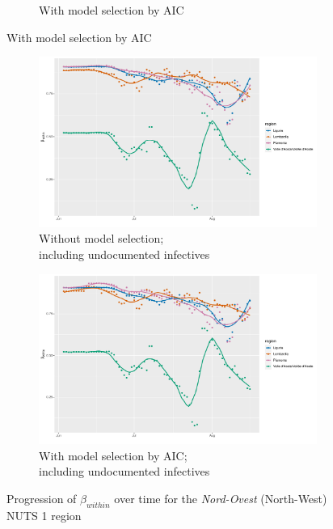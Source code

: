 \documentclass[12pt]{article}
\begin{document}
\begin{appendices}
\begin{figure}[H]
\begin{subfigure}{\textwidth}
    	      \caption{With model selection by AIC}
    	      \label{fig:beta_within_over_time_northwest_aic}
    	    \end{subfigure}
        \end{figure}
        \begin{figure}[H]\ContinuedFloat
    	    \begin{subfigure}{\textwidth}
    	      \centering
    	      \includegraphics[width=0.95\linewidth]{output/model1_lag3_betawithin_Nord-Ovest_UndocQuadratic_rolling.pdf}
    	      \caption{Without model selection; \\ including undocumented infectives}
    	      \label{fig:beta_within_over_time_northwest_regular_undoc}
    	    \end{subfigure}\newline
    	    \begin{subfigure}{\textwidth}
    	      \centering
    	      \includegraphics[width=0.95\linewidth]{output/model1_lag3_betawithin_Nord-Ovest_aic_UndocQuadratic_rolling.pdf}
    	      \caption{With model selection by AIC; \\ including undocumented infectives}
    	      \label{fig:beta_within_over_time_northwest_aic_undoc}
    	    \end{subfigure}
    	    \caption{Progression of $\beta_{within}$ over time for the \textit{Nord-Ovest} (North-West) NUTS 1 region}
    	    \label{fig:beta_within_over_time_northwest}
    	\end{figure}
		

\end{appendices}
\end{document}
